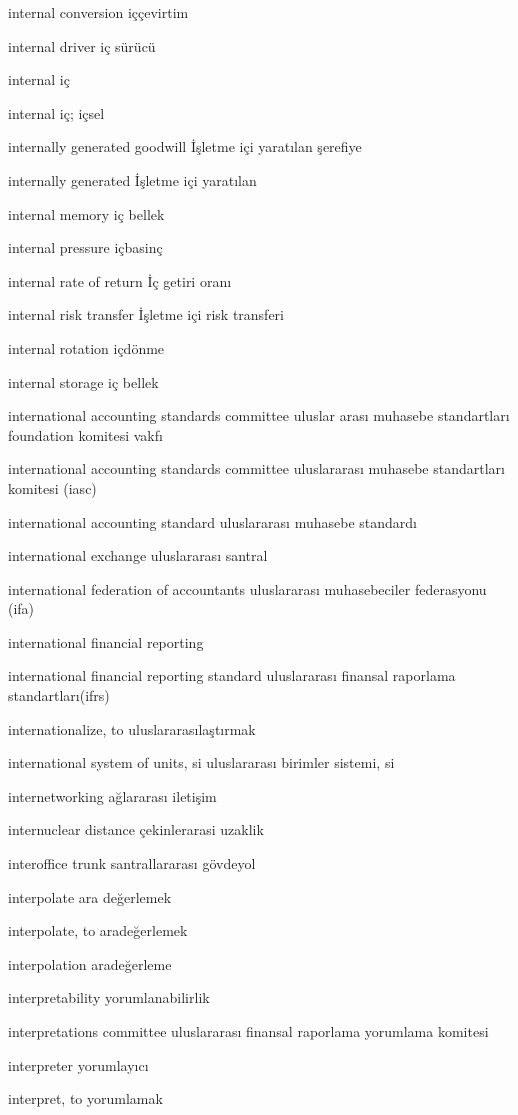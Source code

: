 \documentclass[12pt,fleqn]{article}\usepackage{../../common}
\begin{document}
internal conversion iççevirtim

internal driver iç sürücü

internal iç

internal iç; içsel

internally generated goodwill İşletme içi yaratılan şerefiye

internally generated İşletme içi yaratılan

internal memory iç bellek

internal pressure içbasinç

internal rate of return İç getiri oranı

internal risk transfer İşletme içi risk transferi

internal rotation içdönme

internal storage iç bellek

international accounting standards committee uluslar arası muhasebe standartları foundation komitesi vakfı

international accounting standards committee uluslararası muhasebe standartları komitesi (iasc)

international accounting standard uluslararası muhasebe standardı

international exchange uluslararası santral

international federation of accountants uluslararası muhasebeciler federasyonu (ifa)

international financial reporting

international financial reporting standard uluslararası finansal raporlama standartları(ifrs)

internationalize, to uluslararasılaştırmak

international system of units, si uluslararası birimler sistemi, si

internetworking ağlararası iletişim

internuclear distance çekinlerarasi uzaklik

interoffice trunk santrallararası gövdeyol

interpolate ara değerlemek

interpolate, to aradeğerlemek

interpolation aradeğerleme

interpretability yorumlanabilirlik

interpretations committee uluslararası finansal raporlama yorumlama komitesi

interpreter yorumlayıcı

interpret, to yorumlamak
\end{document}
